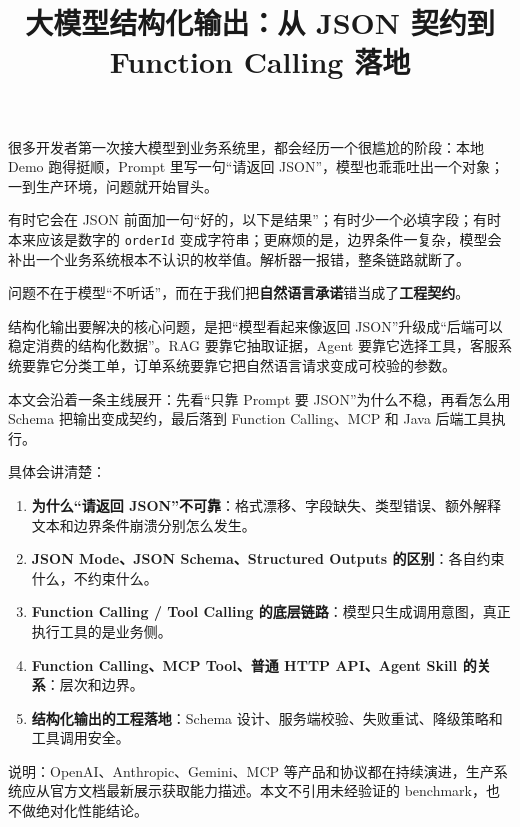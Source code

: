 \documentclass[10pt,a4paper]{ctexart}
\begin{document}
\title{大模型结构化输出：从 JSON 契约到 Function Calling 落地}
\date{}
\maketitle

很多开发者第一次接大模型到业务系统里，都会经历一个很尴尬的阶段：本地 Demo 跑得挺顺，Prompt 里写一句“请返回 JSON”，模型也乖乖吐出一个对象；一到生产环境，问题就开始冒头。



有时它会在 JSON 前面加一句“好的，以下是结果”；有时少一个必填字段；有时本来应该是数字的 \texttt{orderId} 变成字符串；更麻烦的是，边界条件一复杂，模型会补出一个业务系统根本不认识的枚举值。解析器一报错，整条链路就断了。



问题不在于模型“不听话”，而在于我们把\textbf{自然语言承诺}错当成了\textbf{工程契约}。



结构化输出要解决的核心问题，是把“模型看起来像返回 JSON”升级成“后端可以稳定消费的结构化数据”。RAG 要靠它抽取证据，Agent 要靠它选择工具，客服系统要靠它分类工单，订单系统要靠它把自然语言请求变成可校验的参数。



本文会沿着一条主线展开：先看“只靠 Prompt 要 JSON”为什么不稳，再看怎么用 Schema 把输出变成契约，最后落到 Function Calling、MCP 和 Java 后端工具执行。



具体会讲清楚：


\begin{enumerate}[itemsep=2pt, topsep=4pt]
  \item \textbf{为什么“请返回 JSON”不可靠}：格式漂移、字段缺失、类型错误、额外解释文本和边界条件崩溃分别怎么发生。
  \item \textbf{JSON Mode、JSON Schema、Structured Outputs 的区别}：各自约束什么，不约束什么。
  \item \textbf{Function Calling / Tool Calling 的底层链路}：模型只生成调用意图，真正执行工具的是业务侧。
  \item \textbf{Function Calling、MCP Tool、普通 HTTP API、Agent Skill 的关系}：层次和边界。
  \item \textbf{结构化输出的工程落地}：Schema 设计、服务端校验、失败重试、降级策略和工具调用安全。
\end{enumerate}


说明：OpenAI、Anthropic、Gemini、MCP 等产品和协议都在持续演进，生产系统应从官方文档最新展示获取能力描述。本文不引用未经验证的 benchmark，也不做绝对化性能结论。
\end{document}
